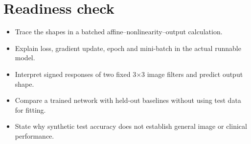 \documentclass[11pt,letterpaper]{article}
\theoremstyle{definition}\newtheorem{definition}{Definition}\newtheorem{example}{Example}
\numberwithin{equation}{section}
\begin{document}
\section*{Readiness check}
\begin{itemize}
\item Trace the shapes in a batched affine--nonlinearity--output calculation.
\item Explain loss, gradient update, epoch and mini-batch in the actual runnable model.
\item Interpret signed responses of two fixed 3$\times$3 image filters and predict output shape.
\item Compare a trained network with held-out baselines without using test data for fitting.
\item State why synthetic test accuracy does not establish general image or clinical performance.
\end{itemize}
\end{document}
